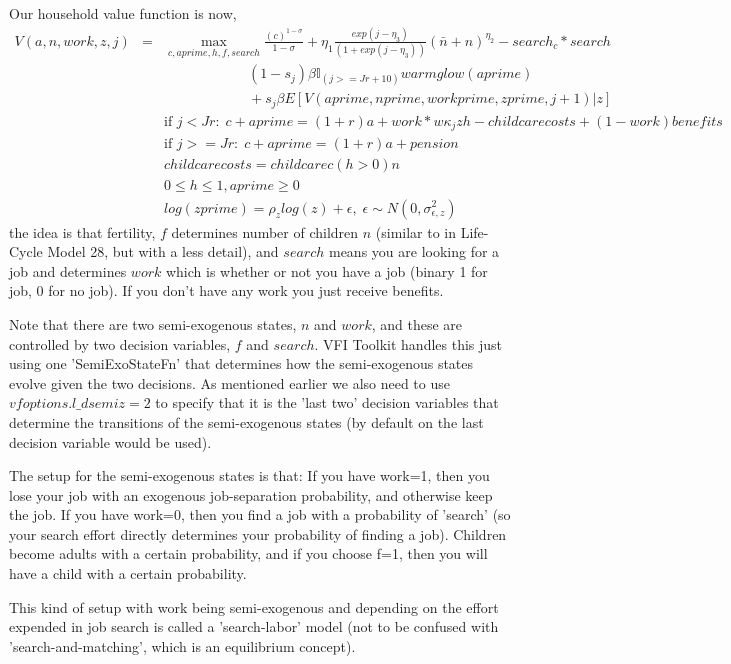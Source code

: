 Our household value function is now,
\begin{eqnarray*}
 V(a,n,work,z,j)&=& \max_{c,aprime,h,f,search} \frac{(c)^{1-\sigma}}{1-\sigma} + \eta_1 \frac{exp(j-\eta_3)}{(1+exp(j-\eta_3))} (\bar{n} + n)^{\eta_2} - search_c * search \\
 && \quad \quad \quad \quad \quad \quad (1-s_j)\beta  \mathbb{I}_{(j>=Jr+10)} warmglow(aprime)    \\
 && \quad \quad \quad \quad \quad \quad  + s_j \beta E[V(aprime,nprime, workprime, zprime,j+1)|z] \\
&& \text{if }j<Jr: \; c+aprime=(1+r)a+work * w \kappa_j z h-childcarecosts + (1-work) benefits\\
&& \text{if }j>=Jr: \; c+aprime=(1+r)a +pension \\
&& childcarecosts=childcarec (h>0) n  \\
&& 0\leq h \leq 1, aprime\geq 0 \\
&& log(zprime)=\rho_z log(z) + \epsilon, \; \epsilon \sim N(0,\sigma_{\epsilon,z}^2)
\end{eqnarray*}
the idea is that fertility, $f$ determines number of children $n$ (similar to in Life-Cycle Model 28, but with a less detail), and $search$ means you are looking for a job and determines $work$ which is whether or not you have a job (binary 1 for job, 0 for no job). If you don't have any work you just receive benefits.

Note that there are two semi-exogenous states, $n$ and $work$, and these are controlled by two decision variables, $f$ and $search$. VFI Toolkit handles this just using one 'SemiExoStateFn' that determines how the semi-exogenous states evolve given the two decisions. As mentioned earlier we also need to use $vfoptions.l\_{}dsemiz=2$ to specify that it is the 'last two' decision variables that determine the transitions of the semi-exogenous states (by default on the last decision variable would be used).

The setup for the semi-exogenous states is that: If you have work=1, then you lose your job with an exogenous job-separation probability, and otherwise keep the job. If you have work=0, then you find a job with a probability of 'search' (so your search effort directly determines your probability of finding a job). Children become adults with a certain probability, and if you choose f=1, then you will have a child with a certain probability.

This kind of setup with work being semi-exogenous and depending on the effort expended in job search is called a 'search-labor' model (not to be confused with 'search-and-matching', which is an equilibrium concept).


